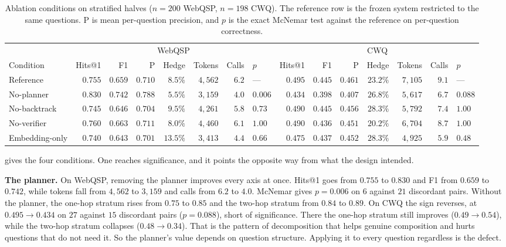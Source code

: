 \begin{table}[!t]
\caption{Ablation conditions on stratified halves ($n = 200$ WebQSP, $n = 198$
  CWQ). The reference row is the frozen system restricted to the same questions.
  P is mean per-question precision, and $p$ is the exact McNemar test against
  the reference on per-question correctness.}
\label{tab:ablation}
\centering
\small
\setlength{\tabcolsep}{4pt}
\begin{tabular}{@{}lrrrrrrlrrrrrrl@{}}
\toprule
& \multicolumn{7}{c}{WebQSP} & \multicolumn{7}{c}{CWQ} \\
\cmidrule(lr){2-8} \cmidrule(l){9-15}
Condition & Hits@1 & F1 & P & Hedge & Tokens & Calls & $p$ & Hits@1 & F1 & P & Hedge & Tokens & Calls & $p$ \\
\midrule
Reference & $0.755$ & $0.659$ & $0.710$ & $8.5\%$ & $4{,}562$ & $6.2$ & --- & $0.495$ & $0.445$ & $0.461$ & $23.2\%$ & $7{,}105$ & $9.1$ & --- \\
No-planner & $\mathbf{0.830}$ & $\mathbf{0.742}$ & $0.788$ & $5.5\%$ & $3{,}159$ & $4.0$ & $0.006$ & $0.434$ & $0.398$ & $0.407$ & $26.8\%$ & $5{,}617$ & $6.7$ & $0.088$ \\
No-backtrack & $0.745$ & $0.646$ & $0.704$ & $9.5\%$ & $4{,}261$ & $5.8$ & $0.73$ & $0.490$ & $0.445$ & $0.456$ & $28.3\%$ & $5{,}792$ & $7.4$ & $1.00$ \\
No-verifier & $0.760$ & $0.663$ & $0.711$ & $8.0\%$ & $4{,}460$ & $6.1$ & $1.00$ & $0.490$ & $0.436$ & $0.451$ & $20.2\%$ & $6{,}704$ & $8.7$ & $1.00$ \\
Embedding-only & $0.740$ & $0.643$ & $0.701$ & $13.5\%$ & $3{,}413$ & $4.4$ & $0.66$ & $0.475$ & $0.437$ & $0.452$ & $28.3\%$ & $4{,}925$ & $5.9$ & $0.48$ \\
\bottomrule
\end{tabular}
\end{table}

 gives the four conditions. One reaches significance, and it
points the opposite way from what the design intended.

\textbf{The planner.} On WebQSP, removing the planner improves every axis at
once. Hits@1 goes from $0.755$ to $0.830$ and F1 from $0.659$ to $0.742$, while
tokens fall from $4{,}562$ to $3{,}159$ and calls from $6.2$ to $4.0$. McNemar
gives $p = 0.006$ on $6$ against $21$ discordant pairs. Without the planner, the
one-hop stratum rises from $0.75$ to $0.85$ and the two-hop stratum from $0.84$
to $0.89$. On CWQ the sign reverses, at $0.495 \to 0.434$ on $27$ against $15$
discordant pairs ($p = 0.088$), short of significance. There the one-hop stratum
still improves ($0.49 \to 0.54$), while the two-hop stratum collapses ($0.48 \to
0.34$). That is the pattern of decomposition that helps genuine composition and
hurts questions that do not need it. So the planner's value depends on question
structure. Applying it to every question regardless is the defect.

